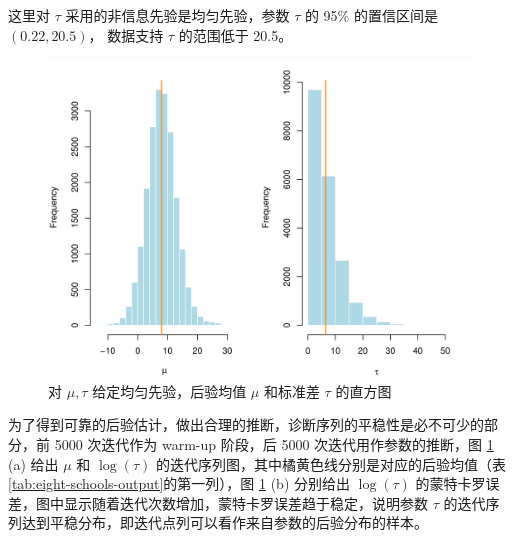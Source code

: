 \documentclass[12pt,a4paper,UTF8,twoside]{book}
\theoremstyle{definition}
\theoremstyle{definition}
\theoremstyle{definition}
\theoremstyle{remark}
\begin{document}
这里对 \(\tau\) 采用的非信息先验是均匀先验，参数 \(\tau\) 的 95\%
的置信区间是 \((0.22,20.5)\)， 数据支持 \(\tau\) 的范围低于 20.5。

\begin{figure}

{\centering \includegraphics[width=0.7\linewidth]{figures/posterior_mu_tau} 

}

\caption{对 $\mu,\tau$ 给定均匀先验，后验均值 $\mu$ 和标准差 $\tau$ 的直方图}\label{fig:posterior-mu-tau}
\end{figure}

为了得到可靠的后验估计，做出合理的推断，诊断序列的平稳性是必不可少的部分，前
5000 次迭代作为 warm-up 阶段，后 5000 次迭代用作参数的推断，图
\ref{fig:posterior-mu-tau} (a) 给出 \(\mu\) 和 \(\log(\tau)\)
的迭代序列图，其中橘黄色线分别是对应的后验均值（表
\ref{tab:eight-schools-output}的第一列），图 \ref{fig:posterior-mu-tau}
(b) 分别给出 \(\log(\tau)\)
的蒙特卡罗误差，图中显示随着迭代次数增加，蒙特卡罗误差趋于稳定，说明参数
\(\tau\)
的迭代序列达到平稳分布，即迭代点列可以看作来自参数的后验分布的样本。
\end{document}
